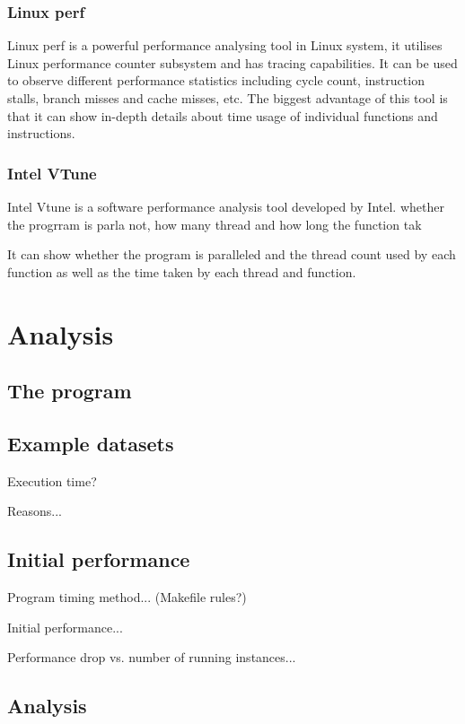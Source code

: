 \documentclass[conference]{IEEEtran}
\begin{document}
\subsubsection{Linux perf}

Linux perf \cite{de2010new} is a powerful performance analysing tool in Linux system, it utilises Linux performance counter subsystem and has tracing capabilities. It can be used to observe different performance statistics including cycle count, instruction stalls, branch misses and cache misses, etc. The biggest advantage of this tool is that it can show in-depth details about time usage of individual functions and instructions.

\subsubsection{Intel VTune}

Intel Vtune \cite{malladi2009using} is a software performance analysis tool developed by Intel. whether the progrram is parla not, how many thread and how long the function tak

It can show whether the program is paralleled and the thread count used by each function as well as the time taken by each thread and function.  

\section{Analysis}

\subsection{The program}

\subsection{Example datasets}

Execution time?

Reasons...

\subsection{Initial performance}

Program timing method... (Makefile rules?)

Initial performance...

Performance drop vs. number of running instances...

\subsection{Analysis}
\end{document}
